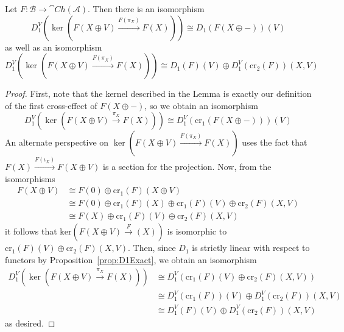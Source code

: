 \begin{lem}[label=DirDerivEquiv]
    Let $F:\mathcal{B}\to \cat{Ch}(\mathcal{A})$. Then there is an isomorphism 
    \begin{equation*}
        D_1^V(\ker(F(X\oplus V)\xrightarrow{F(\pi_X)}F(X)))\cong D_1(F(X\oplus -))(V)
    \end{equation*}
    as well as an isomorphism 
    \begin{equation*}
        D_1^V(\ker(F(X\oplus V)\xrightarrow{F(\pi_X)}F(X))) \cong D_1(F)(V)\oplus D_1^V(\text{cr}_2(F))(X,V)
    \end{equation*}
\end{lem}
\begin{proof}
    First, note that the kernel described in the Lemma is exactly our definition of the first cross-effect of $F(X\oplus -)$, so we obtain an isomorphism 
    \begin{equation*}
        D_1^V(\ker(F(X\oplus V)\xrightarrow{\pi_X}F(X))) \cong D_1^V(\text{cr}_1(F(X\oplus -)))(V)
    \end{equation*}
    An alternate perspective on $\ker(F(X\oplus V)\xrightarrow{F(\pi_X)} F(X))$ uses the fact that $F(X)\xrightarrow{F(\iota_X)}F(X\oplus V)$ is a section for the projection. Now, from the isomorphisms
    \begin{align*}
        F(X\oplus V) &\cong F(0)\oplus \text{cr}_1(F)(X\oplus V) \\
        &\cong F(0)\oplus \text{cr}_1(F)(X)\oplus \text{cr}_1(F)(V)\oplus \text{cr}_2(F)(X,V) \\
        &\cong F(X)\oplus \text{cr}_1(F)(V)\oplus \text{cr}_2(F)(X,V)
    \end{align*}
    it follows that $\text{ker}(F(X\oplus V)\xrightarrow F(X))$ is isomorphic to $\text{cr}_1(F)(V)\oplus \text{cr}_2(F)(X,V)$. Then, since $D_1$ is strictly linear with respect to functors by Proposition~\ref{prop:D1Exact}, we obtain an isomorphism 
    \begin{align*}
        D_1^V(\ker(F(X\oplus V)\xrightarrow{\pi_X}F(X))) &\cong D_1^V(\text{cr}_1(F)(V)\oplus \text{cr}_2(F)(X,V)) \\
        &\cong D_1^V(\text{cr}_1(F))(V)\oplus D_1^V(\text{cr}_2(F))(X,V) \\
        &\cong D_1^V(F)(V)\oplus D_1^V(\text{cr}_2(F))(X,V)
    \end{align*}
    as desired.
\end{proof}

